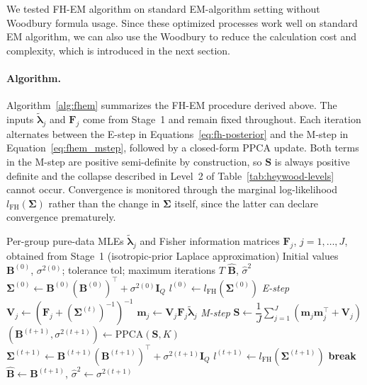 We tested FH-EM algorithm on standard EM-algorithm setting without Woodbury formula usage. Since these optimized processes work well on standard EM algorithm, we can also use the Woodbury to reduce the calculation cost and complexity, which is introduced in the next section. 

\paragraph*{Algorithm.}
\label{para:fhem-algorithm}
Algorithm~\ref{alg:fhem} summarizes the FH-EM procedure derived above. The inputs $\tilde{\bm{\lambda}}_j$ and $\mathbf{F}_j$ come from Stage~1 and remain fixed throughout. Each iteration alternates between the E-step in Equations~\eqref{eq:fh-posterior} and the M-step in Equation~\eqref{eq:fhem_mstep}, followed by a closed-form PPCA update. Both terms in the M-step are positive semi-definite by construction, so $\mathbf{S}$ is always positive definite and the collapse described in Level~2 of Table~\ref{tab:heywood-levels} cannot occur. Convergence is monitored through the marginal log-likelihood $l_{\text{FH}}(\bm{\Sigma})$ rather than the change in $\bm{\Sigma}$ itself, since the latter can declare convergence prematurely.

\begin{algorithm}[htbp]
\caption{FH-EM: maximum-likelihood estimation of $\bm{\Sigma}$}
\label{alg:fhem}
\begin{algorithmic}[1]
\Require Per-group pure-data MLEs $\tilde{\bm{\lambda}}_j$ and Fisher information matrices $\mathbf{F}_j$, $j=1,\dots,J$, obtained from Stage~1 (isotropic-prior Laplace approximation)
\Require Initial values $\mathbf{B}^{(0)}$, $\sigma^{2(0)}$; tolerance $\mathrm{tol}$; maximum iterations $T$
\Ensure $\hat{\mathbf{B}}$, $\hat\sigma^2$
\State $\bm{\Sigma}^{(0)} \gets \mathbf{B}^{(0)}(\mathbf{B}^{(0)})^{\top} + \sigma^{2(0)}\mathbf{I}_Q$
\State $l^{(0)} \gets l_{\text{FH}}(\bm{\Sigma}^{(0)})$
    \Statex \hspace{\algorithmicindent}\textit{E-step}
        \State $\mathbf{V}_j \gets \left(\mathbf{F}_j + (\bm{\Sigma}^{(t)})^{-1}\right)^{-1}$
        \State $\mathbf{m}_j \gets \mathbf{V}_j \mathbf{F}_j \tilde{\bm{\lambda}}_j$
    \EndFor
    \Statex \hspace{\algorithmicindent}\textit{M-step}
    \State $\mathbf{S} \gets \dfrac{1}{J}\displaystyle\sum_{j=1}^{J}\left(\mathbf{m}_j\mathbf{m}_j^{\top} + \mathbf{V}_j\right)$
    \State $\left(\mathbf{B}^{(t+1)}, \sigma^{2(t+1)}\right) \gets \mathrm{PPCA}(\mathbf{S}, K)$ 
    \State $\bm{\Sigma}^{(t+1)} \gets \mathbf{B}^{(t+1)}(\mathbf{B}^{(t+1)})^{\top} + \sigma^{2(t+1)}\mathbf{I}_Q$
    \State $l^{(t+1)} \gets l_{\text{FH}}(\bm{\Sigma}^{(t+1)})$
    \State \textbf{break}
    \EndIf
\EndFor
\State \Return $\hat{\mathbf{B}} \gets \mathbf{B}^{(t+1)}$, $\hat\sigma^2 \gets \sigma^{2(t+1)}$
\end{algorithmic}
\end{algorithm}

